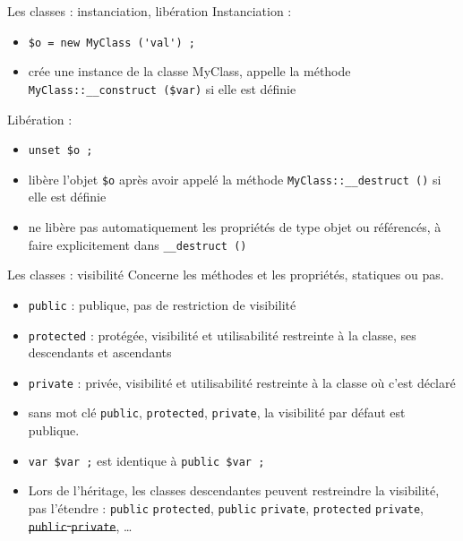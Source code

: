 \begin{frame}[containsverbatim]{Les classes : instanciation, libération}
Instanciation : 
\begin{itemize}
\item \lstinline!$o = new MyClass ('val') ;!
\item crée une instance de la classe MyClass, appelle la méthode \lstinline!MyClass::__construct ($var)! si elle est définie

\end{itemize}
Libération :
\begin{itemize}
\item \lstinline!unset $o ;!
\item libère l'objet \lstinline!$o! après avoir appelé la méthode \lstinline!MyClass::__destruct ()! si elle est définie
\item ne libère pas automatiquement les propriétés de type objet ou référencés, à faire explicitement dans \lstinline!__destruct ()!
\end{itemize}
\end{frame}

\begin{frame}[containsverbatim]{Les classes : visibilité}
Concerne les méthodes et les propriétés, statiques ou pas.
\begin{itemize}
\item \texttt{public} : publique, pas de restriction de visibilité
\item \texttt{protected} : protégée, visibilité et utilisabilité restreinte à la classe, ses descendants et ascendants
\item \texttt{private} : privée, visibilité et utilisabilité restreinte à la classe où c'est déclaré 
\item sans mot clé \texttt{public}, \texttt{protected}, \texttt{private}, la visibilité par défaut est publique.
\item \lstinline!var $var ;! est identique à \lstinline!public $var ;!
\item Lors de l'héritage, les classes descendantes peuvent restreindre la visibilité, pas l'étendre : \texttt{public} \textrightarrow \texttt{protected}, \texttt{public} \textrightarrow \texttt{private}, \texttt{protected} \textrightarrow \texttt{private}, \sout{\texttt{public} \textleftarrow \texttt{private}}, \ldots
\end{itemize}
\end{frame}

